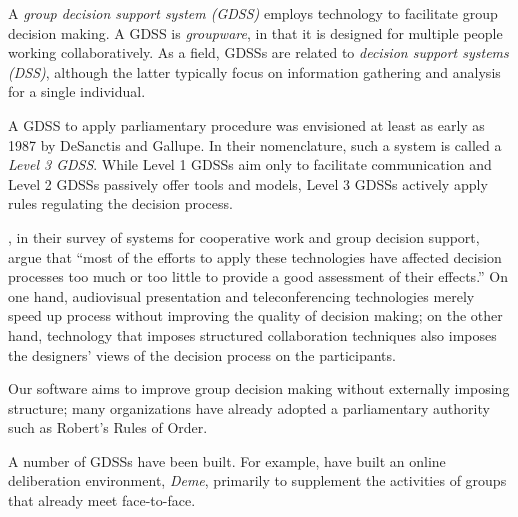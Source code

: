 \documentclass{book}
\begin{document}

A \emph{group decision support system (GDSS)} employs technology to facilitate group decision making. A GDSS is \emph{groupware}, in that it is designed for multiple people working collaboratively. As a field, GDSSs are related to \emph{decision support systems (DSS)}, although the latter typically focus on information gathering and analysis for a single individual.

A GDSS to apply parliamentary procedure was envisioned at least as early as 1987 by DeSanctis and Gallupe. In their nomenclature, such a system is called a \emph{Level 3 GDSS}. While Level 1 GDSSs aim only to facilitate communication and Level 2 GDSSs passively offer tools and models, Level 3 GDSSs actively apply rules regulating the decision process.


\citealt{kraemer:computer-based}, in their survey of systems for cooperative work and group decision support, argue that ``most of the efforts to apply these technologies have affected decision processes too much or too little to provide a good assessment of their effects.'' On one hand, audiovisual presentation and teleconferencing technologies merely speed up process without improving the quality of decision making; on the other hand, technology that imposes structured collaboration techniques also imposes the designers' views of the decision process on the participants.


Our software aims to improve group decision making without externally imposing structure; many organizations have already adopted a parliamentary authority such as Robert's Rules of Order. 

A number of GDSSs have been built. For example, \citealt{davies:online} have built an online deliberation environment, \emph{Deme}, primarily to supplement the activities of groups that already meet face-to-face.

\end{document}
